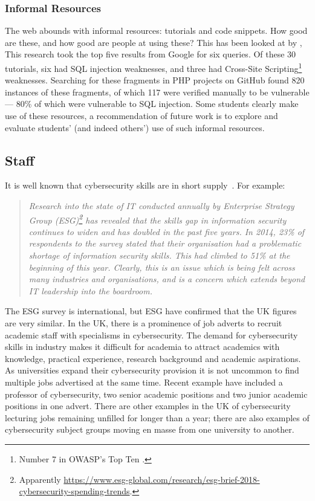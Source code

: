 \documentclass[conference]{IEEEtran}
\begin{document}
\subsubsection{Informal Resources}\label{sec:informal}

The web abounds with informal resources: tutorials and code snippets. How good are these, and how good are people at using these? This has been looked at by \cite{Unruhetal2017a}, This research took the top five results from Google for six queries. Of these 30 tutorials, six had SQL injection weaknesses, and three had Cross-Site Scripting\footnote{Number 7 in OWASP's Top Ten \cite{OWASP2017a}.} weaknesses. Searching for these fragments in PHP projects on GitHub found 820 instances of these fragments, of which 117 were verified manually to be vulnerable --- 80\% of which were vulnerable to SQL injection. Some students clearly make use of these resources, a recommendation of future work is to explore and evaluate students' (and indeed others') use of such informal resources. 

\subsection{Staff}

It is well known that cybersecurity skills are in short supply~\cite{schneider2013}. For example:

\begin{quote}
{\emph{Research into the state of IT conducted annually by Enterprise Strategy Group (ESG)\footnote{Apparently \url{https://www.esg-global.com/research/esg-brief-2018-cybersecurity-spending-trends}.} has revealed that the skills gap in information security continues to widen and has doubled in the past five years. In 2014, 23\% of respondents to the survey stated that their organisation had a problematic shortage of information security skills. This had climbed to 51\% at the beginning of this year. Clearly, this is an issue which is being felt across many industries and organisations, and is a concern which extends beyond IT leadership into the boardroom.}}~\cite{Page2018a}
\end{quote}

The ESG survey is international, but ESG have confirmed that the UK figures are very similar. In the UK, there is a prominence of job adverts to recruit academic staff with specialisms in cybersecurity. The demand for cybersecurity skills in industry makes it difficult for academia to attract academics with knowledge, practical experience, research background and academic aspirations. As universities expand their cybersecurity provision it is not uncommon to find multiple jobs advertised at the same time. Recent example have included a professor of cybersecurity, two senior academic positions and two junior academic positions in one advert. There are other examples in the UK of cybersecurity lecturing jobs remaining unfilled for longer than a year; there are also examples of cybersecurity subject groups moving en masse from one university to another.
\end{document}
